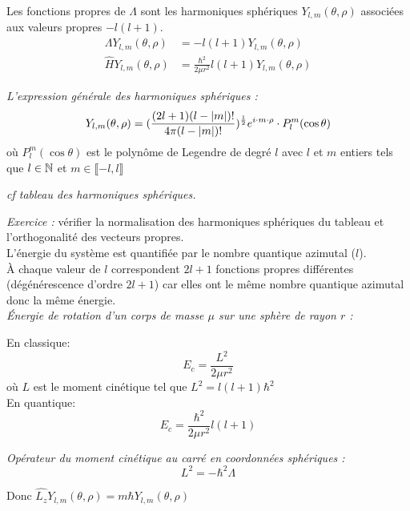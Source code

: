 \documentclass[../main.tex]{subfile}
\begin{document}
  Les fonctions propres de $\Lambda$ sont les harmoniques sphériques $Y_{l,m}(\theta, \rho)$ associées aux valeurs propres $-l(l+1)$.\\

  $$
\begin{aligned}
   \Lambda Y_{l,m}(\theta, \rho) &= -l(l+1) Y_{l,m}(\theta, \rho)\\
   \hat{H} Y_{l,m}(\theta, \rho) &= \frac{\hbar^2}{2\mu r^2}l(l+1) Y_{l,m}(\theta, \rho)
\end{aligned}
  $$

  \emph{L'expression générale des harmoniques sphériques :}\\

  $$Y_{l,m}(\theta, \rho) = (\frac{(2l+1)(l-|m|)!}{4\pi(l-|m|)!})^{1\over 2} e^{i\cdot m \cdot \rho}\cdot P_l^m(\cos \theta)$$
  où $P_l^m (\cos \theta)$ est le polynôme de Legendre de degré $l$ avec $l$ et $m$ entiers tels que $l \in \mathbb{N}$ et $m \in \llbracket -l, l \rrbracket$

 \begin{rema} 
      \it{cf} tableau des harmoniques sphériques.
 \end{rema}

 \emph{Exercice :} vérifier la normalisation des harmoniques sphériques du tableau et l'orthogonalité des vecteurs propres.\\


 L'énergie du système est quantifiée par le nombre quantique azimutal ($l$).\\

   \`A chaque valeur de $l$ correspondent $2l+1$ fonctions propres différentes (dégénérescence d'ordre $2l+1$) car elles ont le même nombre quantique azimutal donc la même énergie.\\

   \emph{Énergie de rotation d'un corps de masse $\mu$ sur une sphère de rayon $r$ :}

   En classique:
   $$E_c = \frac{L^2}{2\mu r^2}$$
   où $L$ est le moment cinétique tel que $L^2 = l(l+1)\hbar^2$\\


   En quantique:
   $$E_c = \frac{\hbar^2}{2\mu r^2} l(l+1)$$

   \emph{Opérateur du moment cinétique au carré en coordonnées sphériques :}
   $$L^2 = -\hbar^2 \Lambda$$

   Donc $\hat{L_z} Y_{l,m} (\theta, \rho) = m \hbar Y_{l,m} (\theta, \rho)$\\
\end{document}
